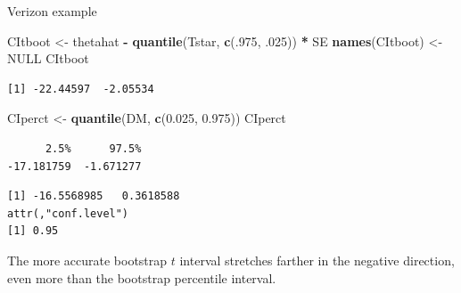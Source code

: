 \documentclass[
  ignorenonframetext,
]{beamer}
\newenvironment{Shaded}{\begin{snugshade}}{\end{snugshade}}
\newcommand{\ConstantTok}[1]{\textcolor[rgb]{0.56,0.35,0.01}{#1}}
\newcommand{\DecValTok}[1]{\textcolor[rgb]{0.00,0.00,0.81}{#1}}
\newcommand{\FloatTok}[1]{\textcolor[rgb]{0.00,0.00,0.81}{#1}}
\newcommand{\FunctionTok}[1]{\textcolor[rgb]{0.13,0.29,0.53}{\textbf{#1}}}
\newcommand{\NormalTok}[1]{#1}
\newcommand{\OtherTok}[1]{\textcolor[rgb]{0.56,0.35,0.01}{#1}}
\newcommand{\SpecialCharTok}[1]{\textcolor[rgb]{0.81,0.36,0.00}{\textbf{#1}}}
\begin{document}
\begin{frame}[fragile]{Verizon example}
\label{verizon-example-1}
\tiny

\begin{Shaded}
\begin{Highlighting}[]
\NormalTok{CItboot }\OtherTok{\textless{}{-}}\NormalTok{ thetahat }\SpecialCharTok{{-}} \FunctionTok{quantile}\NormalTok{(Tstar, }\FunctionTok{c}\NormalTok{(.}\DecValTok{975}\NormalTok{, .}\DecValTok{025}\NormalTok{)) }\SpecialCharTok{*}\NormalTok{ SE}
\FunctionTok{names}\NormalTok{(CItboot) }\OtherTok{\textless{}{-}} \ConstantTok{NULL}
\NormalTok{CItboot}
\end{Highlighting}
\end{Shaded}

\begin{verbatim}
[1] -22.44597  -2.05534
\end{verbatim}

\begin{Shaded}
\begin{Highlighting}[]
\NormalTok{CIperct }\OtherTok{\textless{}{-}} \FunctionTok{quantile}\NormalTok{(DM, }\FunctionTok{c}\NormalTok{(}\FloatTok{0.025}\NormalTok{, }\FloatTok{0.975}\NormalTok{))}
\NormalTok{CIperct}
\end{Highlighting}
\end{Shaded}

\begin{verbatim}
      2.5%      97.5% 
-17.181759  -1.671277 
\end{verbatim}

\begin{Shaded}
\end{Shaded}

\begin{verbatim}
[1] -16.5568985   0.3618588
attr(,"conf.level")
[1] 0.95
\end{verbatim}

\normalsize

The more accurate bootstrap \(t\) interval stretches farther in the
negative direction, even more than the bootstrap percentile interval.
\end{frame}
\end{document}
